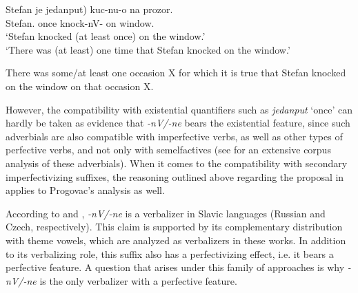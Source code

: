 \documentclass[output=paper,colorlinks,citecolor=brown]{langscibook}
\begin{document}
\ea\label{str:ex:sta+:Progovac2005}
	\ea \gll Stefan je \minsp{(} jedanput) kuc-nu-o na prozor.\\ 
Stefan.{\NOM} {\AUX} {} once knock-nV-{\PTCP} on window.{\ACC} \\ \label{str:ex:sta+:Progovac2005-a}
\glt `Stefan knocked (at least once) on the window.' \\
\glt `There was (at least) one time that Stefan knocked on the window.'


\ex  There was some/at least one occasion X for which it is true that Stefan knocked on the window on that occasion X. \label{str:ex:sta+:Progovac2005-b}

	\z
\z 

\noindent However, the compatibility with existential quantifiers such as \textit{jedanput} `once' can hardly be taken as evidence that \textit{-nV/-ne} bears the existential feature, since such adverbials are also compatible with imperfective verbs, as well as other types of perfective verbs, and not only with semelfactives (see \citealt{Milosavljevic2019} for an extensive corpus analysis of these adverbials). When it comes to the compatibility with secondary imperfectivizing suffixes, the reasoning outlined above regarding the proposal in \citet{Schoorlemmer2004} applies to Progovac’s analysis as well.

According to \citet{sta+:Svenonius2004} and \citet{sta+:Biskup2023, Biskup2023Matryoshka,sta+:Biskup2020}, \textit{-nV/-ne} is a verbalizer in Slavic languages (Russian and Czech, respectively). This claim is supported by its complementary distribution with theme vowels, which are analyzed as verbalizers in these works. In addition to its verbalizing role, this suffix also has a perfectivizing effect, i.e. it bears a perfective feature. A question that arises under this family of approaches is why \textit{-nV/-ne} is the only verbalizer with a perfective feature. 
\end{document}
